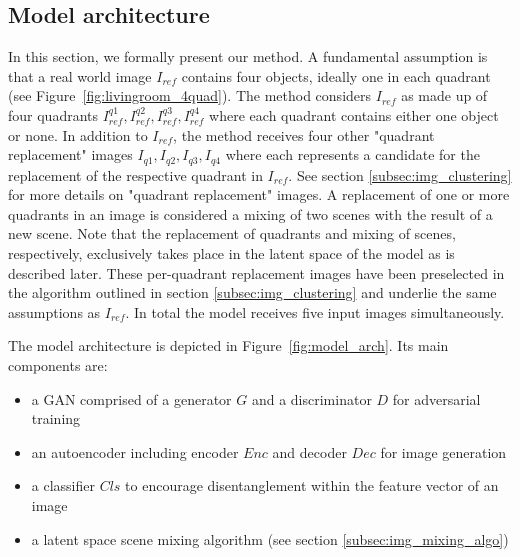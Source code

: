 \documentclass[12pt,a4paper]{article}
\begin{document}

\subsection{Model architecture}\label{subsec:model_arch}
In this section, we formally present our method. A fundamental assumption is that a real world image $I_{ref}$ contains four objects, ideally one in each quadrant (see Figure~\ref{fig:livingroom_4quad}). The method considers $I_{ref}$ as made up of four quadrants $I^{q1}_{ref}, I^{q2}_{ref}, I^{q3}_{ref}, I^{q4}_{ref}$ where each quadrant contains either one object or none. In addition to $I_{ref}$, the method receives four other "quadrant replacement" images $I_{q1},I_{q2},I_{q3},I_{q4}$ where each represents a candidate for the replacement of the respective quadrant in $I_{ref}$. See section \ref{subsec:img_clustering} for more details on "quadrant replacement" images. A replacement of one or more quadrants in an image is considered a mixing of two scenes with the result of a new scene. Note that the replacement of quadrants and mixing of scenes, respectively, exclusively takes place in the latent space of the model as is described later. These per-quadrant replacement images have been preselected in the algorithm outlined in section \ref{subsec:img_clustering} and underlie the same assumptions as $I_{ref}$. In total the model receives five input images simultaneously.

The model architecture is depicted in Figure~\ref{fig:model_arch}. Its main components are:

\begin{itemize}
   \item a GAN comprised of a generator $G$ and a discriminator $D$ for adversarial training
   \item an autoencoder including encoder $Enc$ and decoder $Dec$ for image generation
   \item a classifier $Cls$ to encourage disentanglement within the feature vector of an image
   \item a latent space scene mixing algorithm (see section \ref{subsec:img_mixing_algo})
\end{itemize}
 
\end{document}
